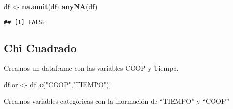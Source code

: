 \documentclass[
]{article}
\newenvironment{Shaded}{\begin{snugshade}}{\end{snugshade}}
\newcommand{\DecValTok}[1]{\textcolor[rgb]{0.00,0.00,0.81}{#1}}
\newcommand{\KeywordTok}[1]{\textcolor[rgb]{0.13,0.29,0.53}{\textbf{#1}}}
\newcommand{\NormalTok}[1]{#1}
\newcommand{\OperatorTok}[1]{\textcolor[rgb]{0.81,0.36,0.00}{\textbf{#1}}}
\newcommand{\StringTok}[1]{\textcolor[rgb]{0.31,0.60,0.02}{#1}}
\begin{document}
\begin{Shaded}
\begin{Highlighting}[]
\NormalTok{df <-}\StringTok{ }\KeywordTok{na.omit}\NormalTok{(df)}
\KeywordTok{anyNA}\NormalTok{(df)}
\end{Highlighting}
\end{Shaded}

\begin{verbatim}
## [1] FALSE
\end{verbatim}

\begin{Shaded}
\end{Shaded}

\hypertarget{chi-cuadrado}{%
\subsection{Chi Cuadrado}\label{chi-cuadrado}}

Creamos un dataframe con las variables COOP y Tiempo.

\begin{Shaded}
\begin{Highlighting}[]
\NormalTok{df.or <-}\StringTok{ }\NormalTok{df[,}\KeywordTok{c}\NormalTok{(}\StringTok{"COOP"}\NormalTok{,}\StringTok{"TIEMPO"}\NormalTok{)]}
\end{Highlighting}
\end{Shaded}

Creamos variables categóricas con la inormación de ``TIEMPO'' y ``COOP''
\end{document}

